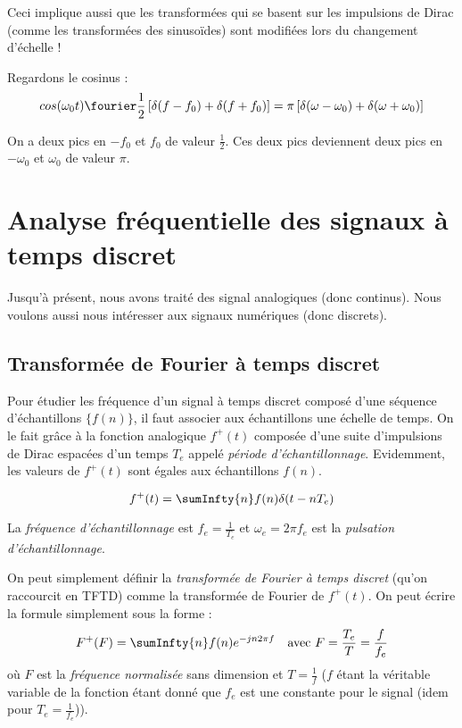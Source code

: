             Ceci implique aussi que les transformées qui se basent sur les impulsions de Dirac (comme les transformées des sinusoïdes) sont modifiées lors du changement d'échelle !

            \begin{exemple}
                Regardons le cosinus :
                $$
                    cos(\omega_0 t) \fourier \frac{1}{2}\left[\delta(f-f_0) + \delta(f+f_0)\right]  = \pi\left[\delta(\omega-\omega_0) + \delta(\omega + \omega_0)\right]
                $$

                On a deux pics en $-f_0$ et $f_0$ de valeur $\frac{1}{2}$. Ces deux pics deviennent deux pics en $-\omega_0$ et $\omega_0$ de valeur $\pi$.
            \end{exemple}

    \section{Analyse fréquentielle des signaux à temps discret}
        Jusqu'à présent, nous avons traité des signal analogiques (donc continus). Nous voulons aussi nous intéresser aux signaux numériques (donc discrets).

        \subsection{Transformée de Fourier à temps discret}
            Pour étudier les fréquence d'un signal à temps discret composé d'une séquence d'échantillons $\{f(n)\}$, il faut associer aux échantillons une échelle de temps. On le fait grâce à la fonction analogique $f^+(t)$ composée d'une suite d'impulsions de Dirac espacées d'un temps $T_e$ appelé \textit{période d'échantillonnage}. Evidemment, les valeurs de $f^+(t)$ sont égales aux échantillons $f(n)$.

            $$
                f^+(t) = \sumInfty{n} f(n)\delta(t-nT_e)
            $$

            La \textit{fréquence d'échantillonnage} est $f_e = \frac{1}{T_e}$ et $\omega_e = 2\pi f_e$ est la \textit{pulsation d'échantillonnage}.

            On peut simplement définir la \textit{transformée de Fourier à temps discret} (qu'on raccourcit en TFTD) comme la transformée de Fourier de $f^+(t)$. On peut écrire la formule simplement sous la forme :
            \begin{align}
                &F^+(F) = \sumInfty{n} f(n) e^{-jn2\pi f} &\mbox{avec } F = \frac{T_e}{T} = \frac{f}{f_e}
                \label{eq:TFTD}
            \end{align}
            où $F$ est la \textit{fréquence normalisée} sans dimension et $T = \frac{1}{f}$ ($f$ étant la véritable variable de la fonction étant donné que $f_e$ est une constante pour le signal (idem pour $T_e = \frac{1}{f_e}$)).

